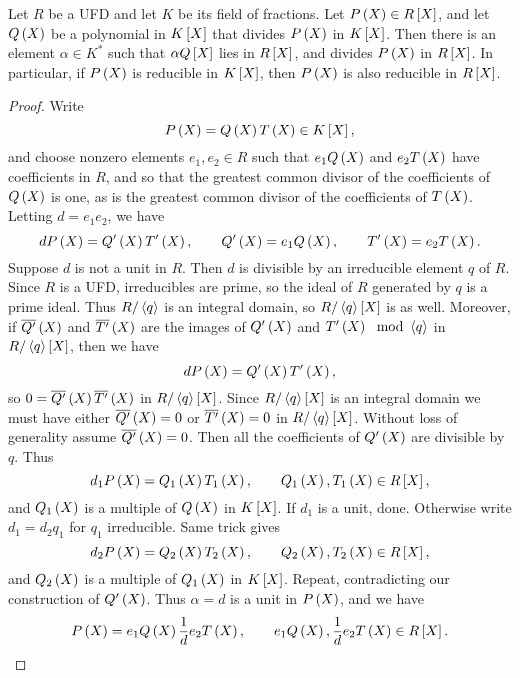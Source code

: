 \begin{theorem}
\label{thm:9.2.1}
Let $ R $ be a UFD and let $ K $ be its field of fractions. Let $ P\rb{X} \in R\sb{X} $, and let $ Q\rb{X} $ be a polynomial in $ K\sb{X} $ that divides $ P\rb{X} $ in $ K\sb{X} $. Then there is an element $ \alpha \in K^* $ such that $ \alpha Q\sb{X} $ lies in $ R\sb{X} $, and divides $ P\rb{X} $ in $ R\sb{X} $. In particular, if $ P\rb{X} $ is reducible in $ K\sb{X} $, then $ P\rb{X} $ is also reducible in $ R\sb{X} $.
\end{theorem}

\begin{proof}
Write
$$ P\rb{X} = Q\rb{X}T\rb{X} \in K\sb{X}, $$
and choose nonzero elements $ e_1, e_2 \in R $ such that $ e_1Q\rb{X} $ and $ e_2T\rb{X} $ have coefficients in $ R $, and so that the greatest common divisor of the coefficients of $ Q\rb{X} $ is one, as is the greatest common divisor of the coefficients of $ T\rb{X} $. Letting $ d = e_1e_2 $, we have
$$ dP\rb{X} = Q'\rb{X}T'\rb{X}, \qquad Q'\rb{X} = e_1Q\rb{X}, \qquad T'\rb{X} = e_2T\rb{X}. $$
Suppose $ d $ is not a unit in $ R $. Then $ d $ is divisible by an irreducible element $ q $ of $ R $. Since $ R $ is a UFD, irreducibles are prime, so the ideal of $ R $ generated by $ q $ is a prime ideal. Thus $ R / \ab{q} $ is an integral domain, so $ R / \ab{q}\sb{X} $ is as well. Moreover, if $ \overline{Q'}\rb{X} $ and $ \overline{T'}\rb{X} $ are the images of $ Q'\rb{X} $ and $ T'\rb{X} \mod \ab{q} $ in $ R / \ab{q}\sb{X} $, then we have
$$ dP\rb{X} = Q'\rb{X}T'\rb{X}, $$
so $ 0 = \overline{Q'}\rb{X}\overline{T'}\rb{X} $ in $ R / \ab{q}\sb{X} $. Since $ R / \ab{q}\sb{X} $ is an integral domain we must have either $ \overline{Q'}\rb{X} = 0 $ or $ \overline{T'}\rb{X} = 0 $ in $ R / \ab{q}\sb{X} $. Without loss of generality assume $ \overline{Q'}\rb{X} = 0 $. Then all the coefficients of $ Q'\rb{X} $ are divisible by $ q $. Thus
$$ d_1P\rb{X} = Q_1\rb{X}T_1\rb{X}, \qquad Q_1\rb{X}, T_1\rb{X} \in R\sb{X}, $$
and $ Q_1\rb{X} $ is a multiple of $ Q\rb{X} $ in $ K\sb{X} $. If $ d_1 $ is a unit, done. Otherwise write $ d_1 = d_2q_1 $ for $ q_1 $ irreducible. Same trick gives
$$ d_2P\rb{X} = Q_2\rb{X}T_2\rb{X}, \qquad Q_2\rb{X}, T_2\rb{X} \in R\sb{X}, $$
and $ Q_2\rb{X} $ is a multiple of $ Q_1\rb{X} $ in $ K\sb{X} $. Repeat, contradicting our construction of $ Q'\rb{X} $. Thus $ \alpha = d $ is a unit in $ P\rb{X} $, and we have
$$ P\rb{X} = e_1Q\rb{X}\dfrac{1}{d}e_2T\rb{X}, \qquad e_1Q\rb{X}, \dfrac{1}{d}e_2T\rb{X} \in R\sb{X}. $$
\end{proof}

